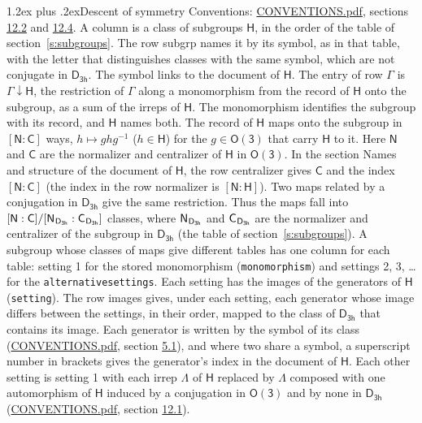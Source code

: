\documentclass[10pt,a4paper]{article}
\makeatletter
\renewcommand\section{\@startsection{section}{1}{\z@}{-3ex plus -1ex minus -.2ex}%
  {1.2ex plus .2ex}{\normalfont\large\sffamily\bfseries\color{parttitle}}}
\numberwithin{equation}{section}
\newcommand{\grp}[1]{\mathsf{#1}}
\newcommand{\grpindex}[2]{[#1 : #2]}
\newcommand{\restr}[2]{#1\!\downarrow#2}
\newcommand{\hairsp}{\mkern1mu}
\makeatother
\begin{document}
\section{Descent of symmetry}\label{s:subduction}
Conventions: \href{../../CONVENTIONS.pdf}{CONVENTIONS.pdf}, sections \href{../../CONVENTIONS.pdf\#conv.12.2}{12.2} and \href{../../CONVENTIONS.pdf\#conv.12.4}{12.4}.
A column is a class of subgroups $\grp{H}$, in the order of the table of section~\ref{s:subgroups}. The row subgrp names it by its symbol, as in that table, with the letter that distinguishes classes with the same symbol, which are not conjugate in $\grp{D_{3h}}$. The symbol links to the document of $\grp{H}$. The entry of row $\Gamma$ is $\restr{\Gamma}{\grp{H}}$, the restriction of $\Gamma$ along a monomorphism from the record of $\grp{H}$ onto the subgroup, as a sum of the irreps of $\grp{H}$. The monomorphism identifies the subgroup with its record, and $\grp{H}$ names both. \label{n:group.normalizer.o3}\label{n:group.centralizer.o3}The record of $\grp{H}$ maps onto the subgroup in $\grpindex{\grp{N}}{\grp{C}}$ ways, $h \mapsto g h g^{-1}$ ($h \in \grp{H}$) for the $g \in \grp{O(3)}$ that carry $\grp{H}$ to it. Here $\grp{N}$ and $\grp{C}$ are the normalizer and centralizer of $\grp{H}$ in \href{O3.pdf}{$\grp{O(3)}$}. In the section Names and structure of the document of $\grp{H}$, the row centralizer gives $\grp{C}$ and the index $\grpindex{\grp{N}}{\grp{C}}$ (the index in the row normalizer is $\grpindex{\grp{N}}{\grp{H}}$). Two maps related by a conjugation in $\grp{D_{3h}}$ give the same restriction. Thus the maps fall into $\grpindex{\grp{N}}{\grp{C}}/\grpindex{\grp{N}_{\hairsp \grp{D_{3h}}}}{\grp{C}_{\hairsp \grp{D_{3h}}}}$ classes, where $\grp{N}_{\hairsp \grp{D_{3h}}}$ and $\grp{C}_{\hairsp \grp{D_{3h}}}$ are the normalizer and centralizer of the subgroup in $\grp{D_{3h}}$ (the table of section~\ref{s:subgroups}). \label{n:head.setting}A subgroup whose classes of maps give different tables has one column for each table: setting 1 for the stored monomorphism (\texttt{monomorphism}) and settings 2, 3, \dots{} for the \texttt{alternativesettings}. Each setting has the images of the generators of $\grp{H}$ (\texttt{setting}). \label{n:head.images}The row images gives, under each setting, each generator whose image differs between the settings, in their order, mapped to the class of $\grp{D_{3h}}$ that contains its image. Each generator is written by the symbol of its class (\href{../../CONVENTIONS.pdf}{CONVENTIONS.pdf}, section \href{../../CONVENTIONS.pdf\#conv.5.1}{5.1}), and where two share a symbol, a superscript number in brackets gives the generator's index in the document of $\grp{H}$. \label{n:irrep.Delta}Each other setting is setting 1 with each irrep $\Lambda$ of $\grp{H}$ replaced by $\Lambda$ composed with one automorphism of $\grp{H}$ induced by a conjugation in \href{O3.pdf}{$\grp{O(3)}$} and by none in $\grp{D_{3h}}$ (\href{../../CONVENTIONS.pdf}{CONVENTIONS.pdf}, section \href{../../CONVENTIONS.pdf\#conv.12.1}{12.1}).
\end{document}
